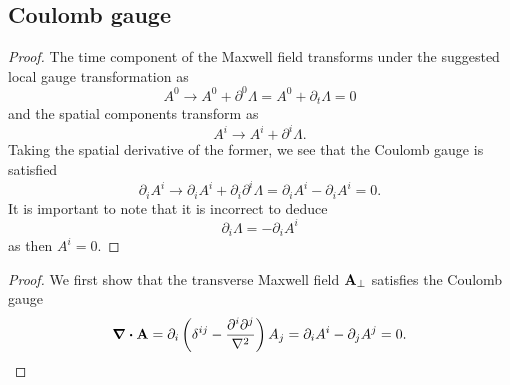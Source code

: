 \subsection{Coulomb gauge}

\mwcoulombfixing
\begin{proof}
	The time component of the Maxwell field transforms under the suggested local gauge transformation as
	\begin{equation*}
		A^0
		\to
		A^0
		+
		\partial^0\Lambda
		=
		A^0
		+
		\partial_t\Lambda
		=
		0
	\end{equation*}
	and the spatial components transform as
	\begin{equation*}
		A^i
		\to
		A^i
		+
		\partial^i\Lambda
		.
	\end{equation*}
	Taking the spatial derivative of the former, we see that the Coulomb gauge is satisfied
	\begin{equation*}
		\partial_i A^i
		\to
		\partial_i A^i
		+
		\partial_i \partial^i\Lambda
		=
		\partial_i A^i
		-
		\partial_i A^i
		=
		0
		.
	\end{equation*}
	It is important to note that it is incorrect to deduce
	\begin{equation*}
		\partial_i
		\Lambda
		=
		-
		\partial_i A^i
	\end{equation*}
	as then $A^i=0$.
\end{proof}
\mwcoulombtransverse
\begin{proof}
	We first show that the transverse Maxwell field $\vb{A}_\perp$ satisfies the Coulomb gauge
	\begin{equation*}
		\div\vb{A}
		=
		\partial_i
		\left(
			\delta^{ij}
			-
			\frac{\partial^i\partial^j}{\laplacian}
		\right)
		A_j
		=
		\partial_iA^i
		-
		\partial_jA^j
		=
		0
		.
	\end{equation*}
\end{proof}
\mwcoulomblagrangian
